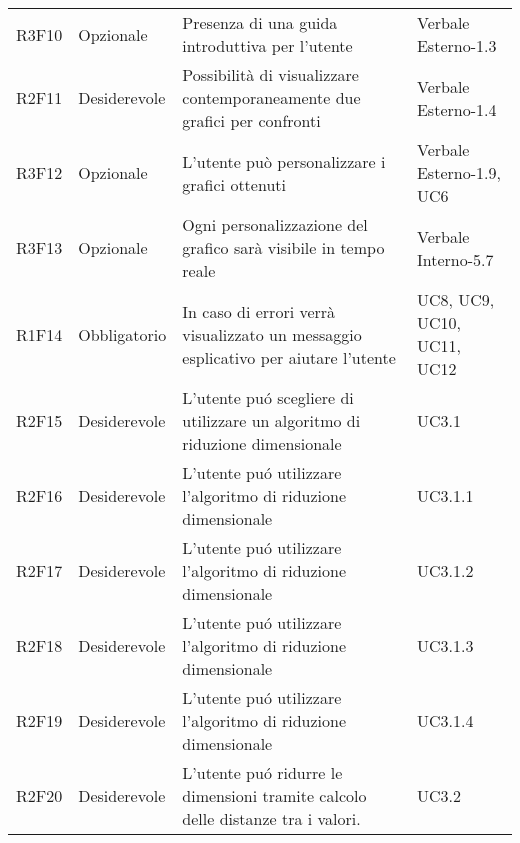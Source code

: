 \begin{center}
\begin{longtable}{C{2cm} | C{3cm} | C{7cm} | C{3.3cm}}
R3F10 & Opzionale & Presenza di una guida introduttiva per l'utente & Verbale Esterno-1.3\\
R2F11 & Desiderevole & Possibilità di visualizzare contemporaneamente due grafici per confronti & Verbale Esterno-1.4\\
R3F12 & Opzionale & L'utente può personalizzare i grafici ottenuti & Verbale Esterno-1.9, UC6 \\
R3F13 & Opzionale & Ogni personalizzazione del grafico sarà visibile in tempo reale & Verbale Interno-5.7 \\
R1F14 & Obbligatorio & In caso di errori verrà visualizzato un messaggio esplicativo per aiutare l'utente & UC8, UC9, UC10, UC11, UC12\\
R2F15 & Desiderevole & L'utente puó scegliere di utilizzare un algoritmo di riduzione dimensionale & UC3.1 \\
R2F16 & Desiderevole & L'utente puó utilizzare l'algoritmo di riduzione dimensionale  & UC3.1.1 \\
R2F17 & Desiderevole & L'utente puó utilizzare l'algoritmo di riduzione dimensionale  & UC3.1.2 \\
R2F18 & Desiderevole & L'utente puó utilizzare l'algoritmo di riduzione dimensionale  & UC3.1.3 \\
R2F19 & Desiderevole & L'utente puó utilizzare l'algoritmo di riduzione dimensionale  & UC3.1.4 \\
R2F20 & Desiderevole & L'utente puó ridurre le dimensioni tramite calcolo delle distanze tra i valori. & UC3.2 \\ 
 

\end{longtable}
\end{center}



